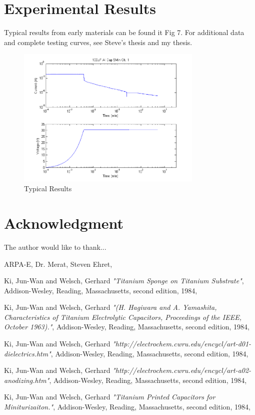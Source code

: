 \documentclass[journal]{IEEEtran}
\begin{document}
\section{Experimental Results}
Typical results from early materials can be found it Fig 7. For additional data and complete testing curves, see Steve’s thesis and my thesis.

\begin{figure}[here]
\centering
\includegraphics[width=3.5in]{measData}
\caption{Typical Results}
\label{fig:measData}
\end{figure}

\section*{Acknowledgment}

The author would like to thank...

ARPA-E,
Dr. Merat,
Steven Ehret,

\ifCLASSOPTIONcaptionsoff
  \newpage
\fi


%
\begin{thebibliography}{1}

 Ki, Jun-Wan and Welsch, Gerhard \emph{"Titanium Sponge on Titanium Substrate"}, Addison-Wesley, Reading,
Massachusetts, second edition, 1984,

 Ki, Jun-Wan and Welsch, Gerhard \emph{"(H. Hagiwara and A. Yamashita, Characteristics of Titanium Electrolytic Capacitors, Proceedings of the IEEE, October 1963)."}, Addison-Wesley, Reading,
Massachusetts, second edition, 1984,

 Ki, Jun-Wan and Welsch, Gerhard \emph{"http://electrochem.cwru.edu/encycl/art-d01-dielectrics.htm"}, Addison-Wesley, Reading,
Massachusetts, second edition, 1984,

 Ki, Jun-Wan and Welsch, Gerhard \emph{"http://electrochem.cwru.edu/encycl/art-a02-anodizing.htm"}, Addison-Wesley, Reading,
Massachusetts, second edition, 1984,

 Ki, Jun-Wan and Welsch, Gerhard \emph{"Titanium Printed Capacitors for Miniturizaiton."}, Addison-Wesley, Reading,
Massachusetts, second edition, 1984,

\end{thebibliography}
\end{document}
